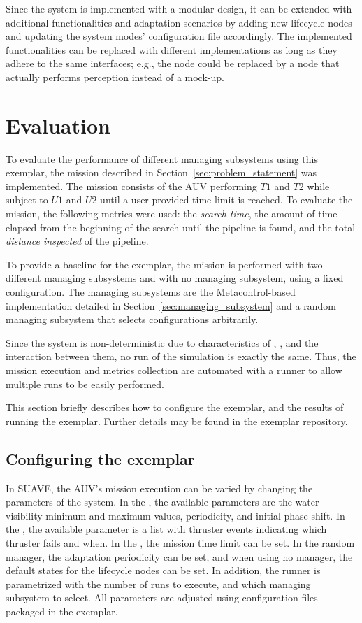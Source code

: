 Since the system is implemented with a modular design, it can be extended with additional functionalities and adaptation scenarios by adding new lifecycle nodes and updating the system modes' configuration file accordingly. The implemented functionalities can be replaced with different implementations as long as they adhere to the same interfaces; e.g., the  node could be replaced by a node that actually performs perception instead of a mock-up.


\section{Evaluation}\label{sec:results}
To evaluate the performance of different managing subsystems using this exemplar, the mission described in Section~\ref{sec:problem_statement} was implemented.
The mission consists of the AUV performing $T1$ and $T2$ while subject to $U1$ and $U2$ until a user-provided time limit  is reached. To evaluate the mission, the following metrics were used: the \emph{search time}, the amount of time elapsed from the beginning of the search until the pipeline is found, and the total \emph{distance inspected} of the pipeline.

To provide a baseline for the exemplar, the mission is performed with two different managing subsystems and with no managing subsystem, using a fixed configuration. The managing subsystems are the Metacontrol-based implementation detailed in Section~\ref{sec:managing_subsystem} and a random managing subsystem that selects configurations arbitrarily.

Since the system is non-deterministic due to characteristics of , , and the interaction between them, no run of the simulation is exactly the same. Thus, the mission execution and metrics collection are automated with a runner to allow multiple runs to be easily performed.

This section briefly describes how to configure the exemplar, and the results of running the exemplar. Further details may be found in the exemplar repository.

\subsection{Configuring the exemplar}

In SUAVE, the AUV's mission execution can be varied by changing the parameters of the system. In the , the available parameters are the water visibility minimum and maximum values, periodicity, and initial phase shift. In the , the available parameter is a list with thruster events indicating which thruster fails and when. In the , the mission time limit can be set. In the random manager, the adaptation periodicity can be set, and when using no manager, the default states for the lifecycle nodes can be set. In addition, the runner is parametrized with the number of runs to execute, and which managing subsystem to select. All parameters are adjusted using configuration files packaged in the exemplar.

